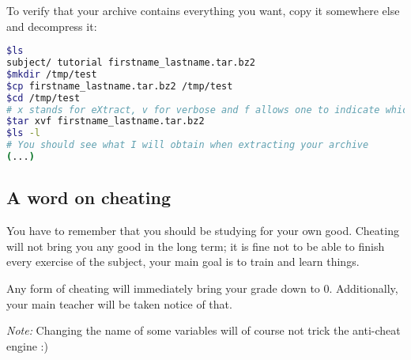 \documentclass[12pt]{article}
\begin{document}
To verify that your archive contains everything you want, copy it somewhere else and decompress it:

\begin{lstlisting}[language=bash]
$ls
subject/ tutorial firstname_lastname.tar.bz2
$mkdir /tmp/test
$cp firstname_lastname.tar.bz2 /tmp/test
$cd /tmp/test
# x stands for eXtract, v for verbose and f allows one to indicate which file tar should work with
$tar xvf firstname_lastname.tar.bz2
$ls -l
# You should see what I will obtain when extracting your archive
(...)
\end{lstlisting}

\subsection{A word on cheating}

You have to remember that you should be studying for your own good. Cheating will not bring you any good in the long term; it is fine not to be able to finish every exercise of the subject, your main goal is to train and learn things.

Any form of cheating will immediately bring your grade down to 0. Additionally, your main teacher will be taken notice of that.

\textit{Note:} Changing the name of some variables will of course not trick the anti-cheat engine :)
\end{document}
